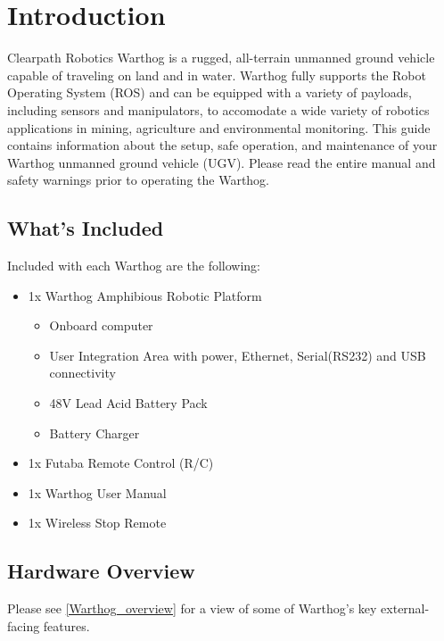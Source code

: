 \documentclass[]{clearpath-latex/clearpath-manual}
\begin{document}
\tableofcontents

\section{Introduction}
Clearpath Robotics Warthog is a rugged, all-terrain unmanned ground vehicle capable of traveling on land and in water.  Warthog fully supports the Robot Operating System (ROS) and can be equipped with a variety of payloads, including sensors and manipulators, to accomodate a wide variety of robotics applications in mining, agriculture and environmental monitoring. This guide contains information about the setup, safe operation, and maintenance of your Warthog unmanned ground vehicle (UGV).  Please read the entire manual and safety warnings prior to operating the Warthog.

\subsection{What's Included}

Included with each Warthog are the following:

\begin{itemize}[nolistsep]
  \item 1x Warthog Amphibious Robotic Platform
  \begin{itemize}
    \item{Onboard computer}
    \item{User Integration Area with power, Ethernet, Serial(RS232) and USB connectivity}
    \item{48V Lead Acid Battery Pack}
    \item{Battery Charger}
  \end{itemize}
  \item 1x Futaba Remote Control (R/C)
  \item 1x Warthog User Manual
  \item 1x Wireless Stop Remote
\end{itemize}



\pagebreak[4]
\subsection{Hardware Overview}

Please see \autoref{Warthog_overview} for a view of some of Warthog's key external-facing features.
\end{document}
